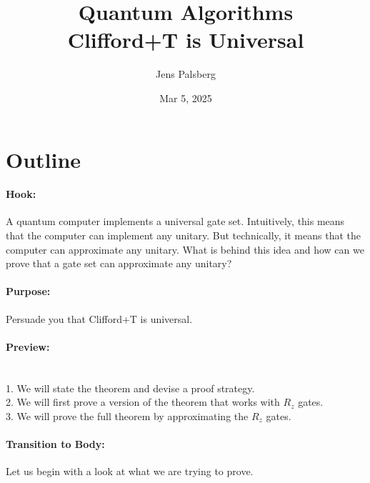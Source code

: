 \documentclass[11pt]{article}
\title{Quantum Algorithms \\
       Clifford+T is Universal}
\author{Jens Palsberg}
\date{Mar 5, 2025}
\begin{document}
\maketitle


\newpage


\vspace*{-1.2cm}

\section*{Outline}

\paragraph{Hook:} 
A quantum computer implements a universal gate set.
Intuitively, this means that the computer can implement any unitary. 
But technically, it means that the computer can approximate any unitary.
What is behind this idea and how can we prove that 
a gate set can approximate any unitary?

\paragraph{Purpose:} Persuade you that Clifford+T is universal.

\paragraph{Preview:} \mbox{} \\
\hspace*{1cm}
1. We will state the theorem and devise a proof strategy.
\\
\hspace*{1cm}
2. We will first prove a version of the theorem that works with $R_z$ gates.
\\
\hspace*{1cm}
3. We will prove the full theorem by approximating the $R_z$ gates.

\paragraph{Transition to Body:} 
Let us begin with a look at what we are trying to prove.
\end{document}
